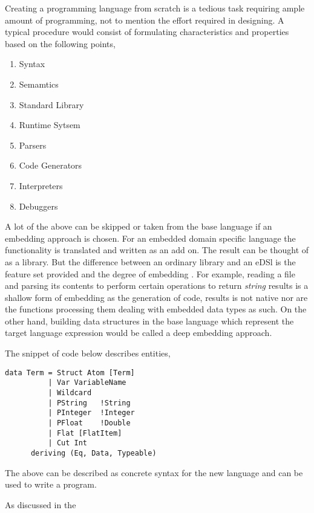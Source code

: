 \documentclass[thesis-solanki.tex]{subfiles}
\begin{document}
Creating a programming language from scratch is a tedious task requiring ample amount of programming, not to mention the effort required in
designing. A typical procedure would consist of formulating characteristics and properties based on the following points,

\begin{enumerate}
\item Syntax
\item Semamtics
\item Standard Library
\item Runtime Sytsem
\item Parsers
\item Code Generators
\item Interpreters
\item Debuggers
\end{enumerate}

A lot of the above can be skipped or taken from the base language if an embedding approach is chosen.
For an embedded domain specific language the functionality is translated and written as an add on.
The result can be thought of as a library.
But the difference between an ordinary library and an eDSl is the feature set provided and the degree of embedding
\cite{website:eDSLhaskellwiki}.
For example, reading a file and parsing its contents to perform certain operations to return \textit{string}
results is a shallow form of embedding as the generation of code, results is not native nor are the functions
processing them dealing with embedded data types as such.
On the other hand, building data structures in the base language which represent the target language expression
would be called a deep embedding approach.

The snippet of  code below describes  entities,

\begin{verbatim}
data Term = Struct Atom [Term]
          | Var VariableName
          | Wildcard
          | PString   !String
          | PInteger  !Integer
          | PFloat    !Double
          | Flat [FlatItem]
          | Cut Int
      deriving (Eq, Data, Typeable)
\end{verbatim}

The above can be described as concrete syntax for the new language and can be used to write a program.


As discussed in the
\end{document}
